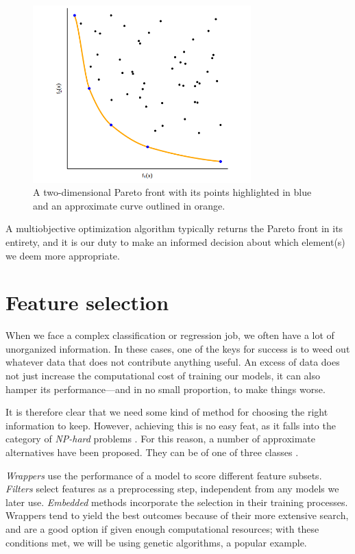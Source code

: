 	\begin{figure}[bth]

        \myfloatalign
        \includegraphics[width=0.75\textwidth]{gfx/ParetoFront.png}
        \caption{A two-dimensional Pareto front with its points highlighted in blue and an approximate curve outlined in orange.}

    \end{figure}

    A multiobjective optimization algorithm typically returns the Pareto front in its entirety, and it is our duty to make an informed decision about which element(s) we deem more appropriate.

\section{Feature selection}

	When we face a complex classification or regression job, we often have a lot of unorganized information. In these cases, one of the keys for success is to weed out whatever data that does not contribute anything useful. An excess of data does not just increase the computational cost of training our models, it can also hamper its performance---and in no small proportion, to make things worse.

	It is therefore clear that we need some kind of method for choosing the right information to keep. However, achieving this is no easy feat, as it falls into the category of \textit{NP-hard} problems \cite{amaldi1998approximability}. For this reason, a number of approximate alternatives have been proposed. They can be of one of three classes \cite{guyon2003introduction}.

	\textit{Wrappers} use the performance of a model to score different feature subsets. \textit{Filters} select features as a preprocessing step, independent from any models we later use. \textit{Embedded} methods incorporate the selection in their training processes. Wrappers tend to yield the best outcomes because of their more extensive search, and are a good option if given enough computational resources; with these conditions met, we will be using genetic algorithms, a popular example.


